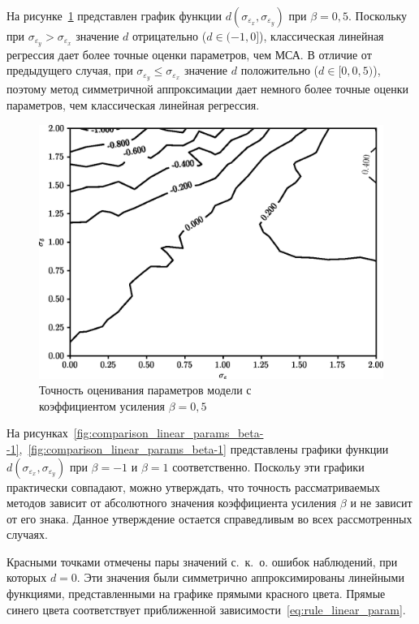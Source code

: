 На рисунке~\ref{fig:comparison_linear_params_beta-0,5}
представлен график функции \( d(\sigma_{\varepsilon_x}, \sigma_{\varepsilon_y}) \)
при \( \beta = 0{,}5 \).
Поскольку при \( \sigma_{\varepsilon_y} > \sigma_{\varepsilon_x} \)
значение \( d \) отрицательно (\( d \in ( -1, 0 ] \)),
классическая линейная регрессия дает более точные оценки параметров, чем МСА.
В отличие от предыдущего случая,
при \( \sigma_{\varepsilon_y} \le \sigma_{\varepsilon_x} \)
значение \( d \) положительно (\( d \in [0, 0{,}5 ) \)),
поэтому метод симметричной аппроксимации дает немного более точные оценки параметров,
чем классическая линейная регрессия.

\begin{figure}[t]
  \centering
  \includegraphics[width=135mm]{fig/linear/param/beta-0,5_param.png}
  \caption{%
    Точность оценивания параметров модели с \\
    коэффициентом усиления \( \beta = 0{,}5 \)
  }\label{fig:comparison_linear_params_beta-0,5}
\end{figure}

На рисунках~\ref{fig:comparison_linear_params_beta--1},~\ref{fig:comparison_linear_params_beta-1}
представлены графики функции \( d(\sigma_{\varepsilon_x}, \sigma_{\varepsilon_y}) \)
при \( \beta = -1 \) и \( \beta = 1 \) соответственно.
Поскольу эти графики практически совпадают, можно утверждать, что точность рассматриваемых
методов зависит от абсолютного значения коэффициента усиления \( \beta \) и не зависит от его знака.
Данное утверждение остается справедливым во всех рассмотренных случаях.

Красными точками отмечены пары значений с.~к.~о. ошибок наблюдений, при которых \( d = 0 \).
Эти значения были симметрично аппроксимированы линейными функциями,
представленными на графике прямыми красного цвета.
Прямые синего цвета соответствует приближенной зависимости~\eqref{eq:rule_linear_param}.

